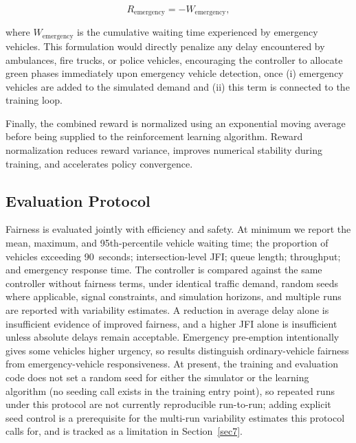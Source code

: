 \documentclass[3p,times]{elsarticle}
\theoremstyle{plain}
\theoremstyle{definition}
\begin{document}
\begin{equation}
R_{\text{emergency}}
=
-W_{\text{emergency}},
\end{equation}

where $W_{\text{emergency}}$ is the cumulative waiting time
experienced by emergency vehicles. This formulation would directly
penalize any delay encountered by ambulances, fire trucks, or police
vehicles, encouraging the controller to allocate green phases
immediately upon emergency vehicle detection, once (i) emergency
vehicles are added to the simulated demand and (ii) this term is
connected to the training loop.

Finally, the combined reward is normalized using an exponential
moving average before being supplied to the reinforcement learning
algorithm. Reward normalization reduces reward variance, improves
numerical stability during training, and accelerates policy
convergence.

\subsection{Evaluation Protocol}

Fairness is evaluated jointly with efficiency and safety. At minimum we report the mean,
maximum, and 95th-percentile vehicle waiting time; the proportion of vehicles exceeding
90~seconds; intersection-level JFI; queue length; throughput; and emergency response time. The
controller is compared against the same controller without fairness terms, under identical
traffic demand, random seeds where applicable, signal constraints, and simulation horizons, and
multiple runs are reported with variability estimates. A reduction in average delay alone is
insufficient evidence of improved fairness, and a higher JFI alone is insufficient unless
absolute delays remain acceptable. Emergency pre-emption intentionally gives some vehicles
higher urgency, so results distinguish ordinary-vehicle fairness from emergency-vehicle
responsiveness. At present, the training and evaluation code does not set a random seed for
either the simulator or the learning algorithm (no seeding call exists in the training
entry point), so repeated runs under this protocol are not currently reproducible run-to-run;
adding explicit seed control is a prerequisite for the multi-run variability estimates this
protocol calls for, and is tracked as a limitation in Section~\ref{sec7}.


\end{document}
